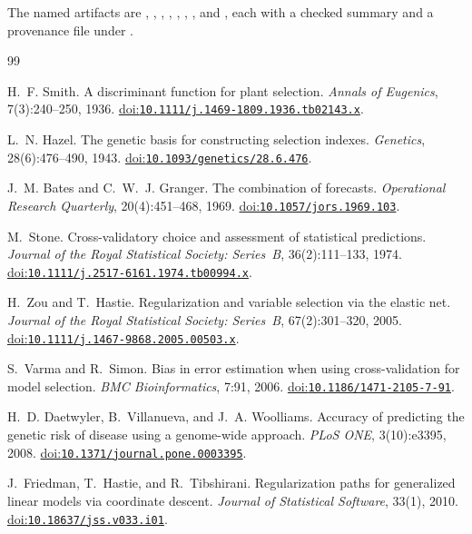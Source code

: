 \documentclass[11pt,a4paper]{article}
\newcommand{\doi}[1]{\href{https://doi.org/#1}{doi:\allowbreak\texttt{#1}}}
\begin{document}
The named artifacts are
,
,
,
,
,
,
, and
,
each with a checked summary and a provenance file under
.

\begin{thebibliography}{99}

H.~F. Smith.
\newblock A discriminant function for plant selection.
\newblock \emph{Annals of Eugenics}, 7(3):240--250, 1936.
\newblock \doi{10.1111/j.1469-1809.1936.tb02143.x}.

L.~N. Hazel.
\newblock The genetic basis for constructing selection indexes.
\newblock \emph{Genetics}, 28(6):476--490, 1943.
\newblock \doi{10.1093/genetics/28.6.476}.

J.~M. Bates and C.~W.~J. Granger.
\newblock The combination of forecasts.
\newblock \emph{Operational Research Quarterly}, 20(4):451--468, 1969.
\newblock \doi{10.1057/jors.1969.103}.

M.~Stone.
\newblock Cross-validatory choice and assessment of statistical
predictions.
\newblock \emph{Journal of the Royal Statistical Society: Series~B},
36(2):111--133, 1974.
\newblock \doi{10.1111/j.2517-6161.1974.tb00994.x}.

H.~Zou and T.~Hastie.
\newblock Regularization and variable selection via the elastic net.
\newblock \emph{Journal of the Royal Statistical Society: Series~B},
67(2):301--320, 2005.
\newblock \doi{10.1111/j.1467-9868.2005.00503.x}.

S.~Varma and R.~Simon.
\newblock Bias in error estimation when using cross-validation for
model selection.
\newblock \emph{BMC Bioinformatics}, 7:91, 2006.
\newblock \doi{10.1186/1471-2105-7-91}.

H.~D. Daetwyler, B.~Villanueva, and J.~A. Woolliams.
\newblock Accuracy of predicting the genetic risk of disease using a
genome-wide approach.
\newblock \emph{PLoS ONE}, 3(10):e3395, 2008.
\newblock \doi{10.1371/journal.pone.0003395}.

J.~Friedman, T.~Hastie, and R.~Tibshirani.
\newblock Regularization paths for generalized linear models via
coordinate descent.
\newblock \emph{Journal of Statistical Software}, 33(1), 2010.
\newblock \doi{10.18637/jss.v033.i01}.


\end{thebibliography}
\end{document}
